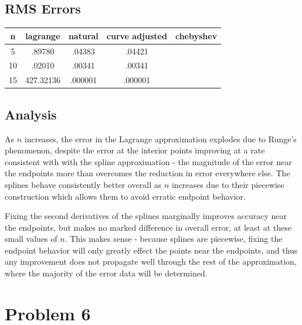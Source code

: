 \documentclass[11pt]{article} %
\begin{document}
\subsection*{RMS Errors}
{\renewcommand{\arraystretch}{1.3} %
\begin{tabular}{| c | c c c c |}
\hline
n & lagrange & natural & curve adjusted & chebyshev\\
\hline
5 & .89780 & .04383 & .04421 & \\
10 & .02010 & .00341 & .00341 &\\
15 & 427.32136 & .000001&  .000001 &\\
\hline
\end{tabular}
\subsection*{Analysis}

As $n$ increases, the error in the Lagrange approximation explodes due to Runge's phenomenon, despite the error at the interior points improving at a rate consistent with
with the spline approximation - the magnitude of the error near the endpoints more than overcomes the reduction in error everywhere else. The splines behave consistently better
overall as $n$ increases due to their piecewise construction which allows them to avoid erratic endpoint behavior. 
\par Fixing the second derivatives of the splines marginally improves
accuracy near the endpoints, but makes no marked difference in overall error, at least at these small values of $n$. This makes sense - because splines are piecewise, fixing the endpoint
behavior will only greatly effect the points near the endpoints, and thus any improvement does not propagate well through the rest of the approximation, where the majority of the 
error data will be determined.
\par %

\newpage
\section*{Problem 6}
}
\end{document}
